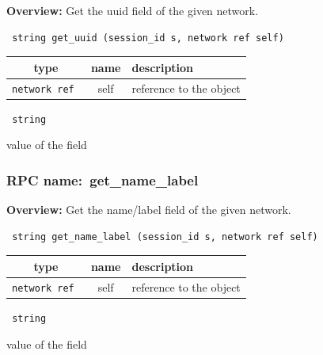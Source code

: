 {\bf Overview:} 
Get the uuid field of the given network.

\begin{verbatim} string get_uuid (session_id s, network ref self)\end{verbatim}



 
\vspace{0.3cm}
\begin{tabular}{|c|c|p{7cm}|}
 \hline
{\bf type} & {\bf name} & {\bf description} \\ \hline
{\tt network ref } & self & reference to the object \\ \hline 

\end{tabular}

\vspace{0.3cm}

{\tt 
string
}


value of the field
\vspace{0.3cm}
\vspace{0.3cm}
\vspace{0.3cm}
\subsubsection{RPC name:~get\_name\_label}

{\bf Overview:} 
Get the name/label field of the given network.

\begin{verbatim} string get_name_label (session_id s, network ref self)\end{verbatim}



 
\vspace{0.3cm}
\begin{tabular}{|c|c|p{7cm}|}
 \hline
{\bf type} & {\bf name} & {\bf description} \\ \hline
{\tt network ref } & self & reference to the object \\ \hline 

\end{tabular}

\vspace{0.3cm}

{\tt 
string
}


value of the field
\vspace{0.3cm}
\vspace{0.3cm}
\vspace{0.3cm}
